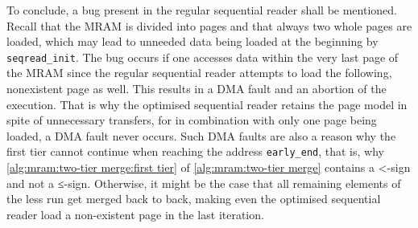 To conclude, a bug present in the regular sequential reader shall be mentioned.
Recall that the \ac{MRAM} is divided into pages and that always two whole pages are loaded, which may lead to unneeded data being loaded at the beginning by \lstinline|seqread_init|.
The bug occurs if one accesses data within the very last page of the \ac{MRAM} since the regular sequential reader attempts to load the following, nonexistent page as well.
This results in a \ac{DMA} fault and an abortion of the execution.
That is why the optimised sequential reader retains the page model in spite of unnecessary transfers, for in combination with only one page being loaded, a \ac{DMA} fault never occurs.
Such \ac{DMA} faults are also a reason why the first tier cannot continue when reaching the address \lstinline|early_end|, that is, why \cref{alg:mram:two-tier merge:first tier} of \cref{alg:mram:two-tier merge} contains a <-sign and not a ≤-sign.
Otherwise, it might be the case that all remaining elements of the less run get merged back to back, making even the optimised sequential reader load a non-existent page in the last iteration.
